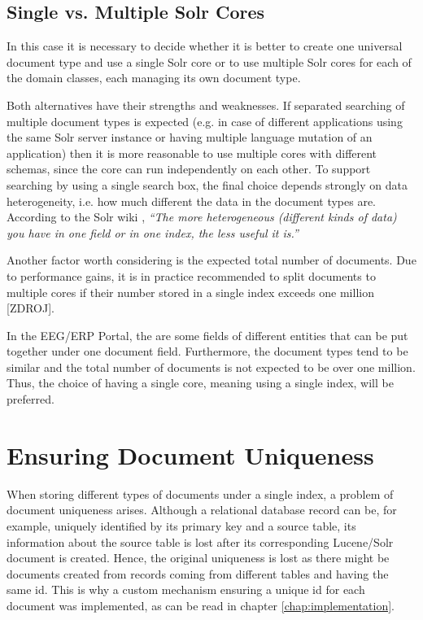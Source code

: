 \subsection{Single vs. Multiple Solr Cores}

In this case it is necessary to decide whether it is better to create one universal document type and use a single Solr core 
or to use multiple Solr cores for each of the domain classes, each managing its own document type.

Both alternatives have their strengths and weaknesses. 
If separated searching of multiple document types is expected (e.g. in case of different applications using the same Solr server instance or having multiple language mutation of an application) then it is more reasonable to use multiple cores with different schemas, since the core can run independently on each other.
To support searching by using a single search box, the final choice depends strongly on data heterogeneity, i.e. how much different the data in the document types are. According to the Solr wiki \cite{Solr:SchemaDesign}, \textit{``The more heterogeneous (different kinds of data) you have in one field or in one index, the less useful it is.''}

Another factor worth considering is the expected total number of documents. Due to performance gains, it is in practice recommended to split documents to multiple cores if their number stored in a single index exceeds one million [ZDROJ].

In the EEG/ERP Portal, the are some fields of different entities that can be put together under one document field.
Furthermore, the document types tend to be similar %
and the total number of documents is not expected to be over one million.
Thus, the choice of having a single core, meaning using a single index, will be preferred.


\section{Ensuring Document Uniqueness}

When storing different types of documents under a single index, a problem of document uniqueness arises. 
Although a relational database record can be, for example, uniquely identified by its primary key and a source table, its information about the source table is lost after its corresponding Lucene/Solr document is created.
Hence, the original uniqueness is lost as there might be documents created from records coming from different tables and having the same id. 
This is why a custom mechanism ensuring a unique id for each document was implemented, as can be read in chapter \ref{chap:implementation}.

